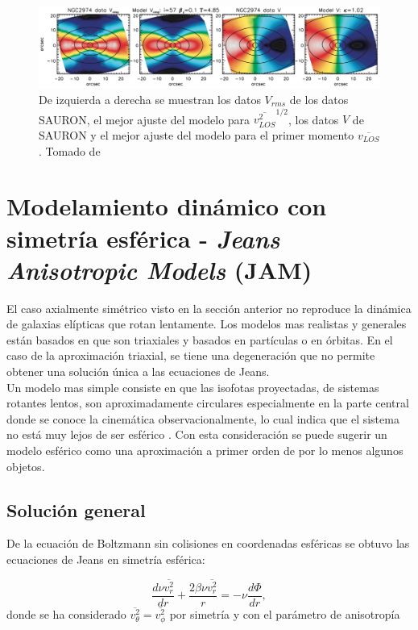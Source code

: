 \begin{figure}
  \centering
    \includegraphics[width=0.95\columnwidth]{Kap2/NGC2974_3.png}
  \caption{De izquierda a derecha se muestran los datos $V_{rms}$ de los datos SAURON, el mejor ajuste del modelo para $\overline{v_{LOS}^2}^{1/2}$, los datos $V$ de SAURON y el mejor ajuste del modelo para el primer momento $\overline{v_{LOS}}$. Tomado de \cite{2008MNRAS.390_71C}}
  \label{fig:NGC2974_2}
\end{figure}


\section{Modelamiento dinámico con simetría esférica - \emph{Jeans Anisotropic Models} (JAM)}

El caso axialmente simétrico visto en la sección anterior no reproduce la dinámica de galaxias elípticas que rotan lentamente. Los modelos mas realistas y generales están basados en que son triaxiales y basados en partículas o en órbitas. En el caso de la aproximación triaxial, se tiene una degeneración que no permite obtener una solución única a las ecuaciones de Jeans.\\

Un modelo mas simple consiste en que las isofotas proyectadas, de sistemas rotantes lentos, son aproximadamente circulares especialmente en la parte central donde se conoce la cinemática observacionalmente, lo cual indica que el sistema no está muy lejos de ser esférico \cite{2008MNRAS.390_71C}. Con esta consideración se puede sugerir un modelo esférico como una aproximación a primer orden de por lo menos algunos objetos.\\

\subsection{Solución general}

De la ecuación de Boltzmann sin colisiones en coordenadas esféricas se obtuvo las ecuaciones de Jeans en simetría esférica:

\begin{equation}
\label{Jeans_spheric_r}
\frac{d \nu \overline{ v_r^2 } }{ dr } + \frac{2 \beta \nu \overline{ v_r^2 } }{r} = -\nu \frac{ d \Phi }{dr},
\end{equation}
donde se ha considerado $\overline{ v_{\theta}^2 } = \overline{ v_{\phi}^2 }$ por simetría y con el parámetro de anisotropía 

